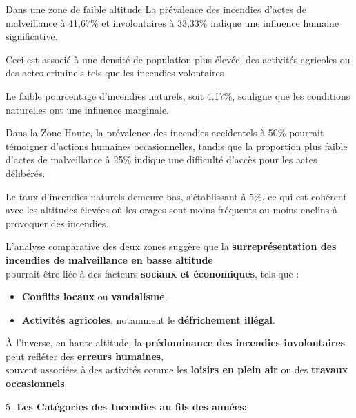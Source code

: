 \documentclass[
]{article}
\providecommand{\tightlist}{%
  \setlength{\itemsep}{0pt}\setlength{\parskip}{0pt}}
\begin{document}
Dans une zone de faible altitude La prévalence des incendies d'actes de
malveillance à 41,67\% et involontaires à 33,33\% indique une influence
humaine significative.

Ceci est associé à une densité de population plus élevée, des activités
agricoles ou des actes criminels tels que les incendies volontaires.

Le faible pourcentage d'incendies naturels, soit 4.17\%, souligne que
les conditions naturelles ont une influence marginale.

Dans la Zone Haute, la prévalence des incendies accidentels à 50\%
pourrait témoigner d'actions humaines occasionnelles, tandis que la
proportion plus faible d'actes de malveillance à 25\% indique une
difficulté d'accès pour les actes délibérés.

Le taux d'incendies naturels demeure bas, s'établissant à 5\%, ce qui
est cohérent avec les altitudes élevées où les orages sont moins
fréquents ou moins enclins à provoquer des incendies.

L'analyse comparative des deux zones suggère que la
\textbf{surreprésentation des incendies de malveillance en basse
altitude}\\
pourrait être liée à des facteurs \textbf{sociaux et économiques}, tels
que :

\begin{itemize}
\tightlist
\item
  \textbf{Conflits locaux} ou \textbf{vandalisme},\\
\item
  \textbf{Activités agricoles}, notamment le \textbf{défrichement
  illégal}.
\end{itemize}

À l'inverse, en haute altitude, la \textbf{prédominance des incendies
involontaires} peut refléter des \textbf{erreurs humaines},\\
souvent associées à des activités comme les \textbf{loisirs en plein
air} ou des \textbf{travaux occasionnels}.

5- \textbf{Les Catégories des Incendies au fils des années:}
\end{document}
